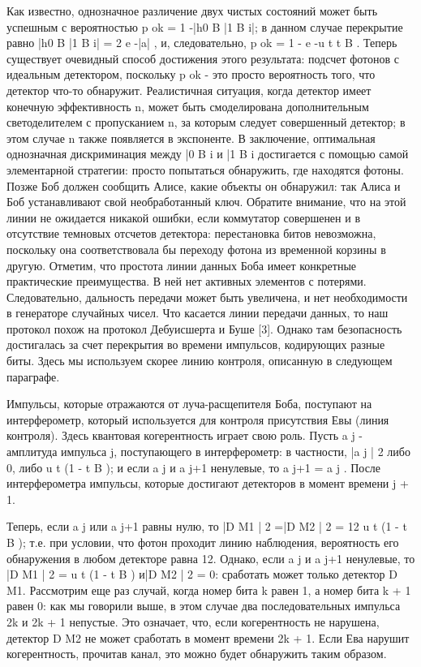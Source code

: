 Как известно, однозначное различение двух чистых состояний может быть успешным с вероятностью p ok = 1 -|h0 B |1 B i|; в данном случае перекрытие равно |h0 B |1 B i| = 2 e -|a| , и, следовательно, p ok = 1 - e -u t t B . Теперь существует очевидный способ достижения этого результата: подсчет фотонов с идеальным детектором, поскольку p ok - это просто вероятность того, что детектор что-то обнаружит. Реалистичная ситуация, когда детектор имеет конечную эффективность n, может быть смоделирована дополнительным светоделителем с пропусканием n, за которым следует совершенный детектор; в этом случае n также появляется в экспоненте. В заключение, оптимальная однозначная дискриминация между |0 B i и |1 B i достигается с помощью самой элементарной стратегии: просто попытаться обнаружить, где находятся фотоны. Позже Боб должен сообщить Алисе, какие объекты он обнаружил: так Алиса и Боб устанавливают свой необработанный ключ. Обратите внимание, что на этой линии не ожидается никакой ошибки, если коммутатор совершенен и в отсутствие темновых отсчетов детектора: перестановка битов невозможна, поскольку она соответствовала бы переходу фотона из временной корзины в другую. Отметим, что простота линии данных Боба имеет конкретные практические преимущества. В ней нет активных элементов с потерями. Следовательно, дальность передачи может быть увеличена, и нет необходимости в генераторе случайных чисел. Что касается линии передачи данных, то наш протокол похож на протокол Дебуисшерта и Буше [3]. Однако там безопасность достигалась за счет перекрытия во времени импульсов, кодирующих разные биты. Здесь мы используем скорее линию контроля, описанную в следующем параграфе.

Импульсы, которые отражаются от луча-расщепителя Боба, поступают на интерферометр, который используется для контроля присутствия Евы (линия контроля). Здесь квантовая когерентность играет свою роль. Пусть a j - амплитуда импульса j, поступающего в интерферометр: в частности, |a j | 2 либо 0, либо u t (1 - t B ); и если a j и a j+1 ненулевые, то a j+1 = a j . После интерферометра импульсы, которые достигают детекторов в момент времени j + 1.


Теперь, если a j или a j+1 равны нулю, то |D M1 | 2 =|D M2 | 2 = 12 u t (1 - t B ); т.е. при условии, что фотон проходит линию наблюдения, вероятность его обнаружения в любом детекторе равна 12. Однако, если a j и a j+1 ненулевые, то |D M1 | 2 = u t (1 - t B ) и|D M2 | 2 = 0: сработать может только детектор D M1. Рассмотрим еще раз случай, когда номер бита k равен 1, а номер бита k + 1 равен 0: как мы говорили выше, в этом случае два последовательных импульса 2k и 2k + 1 непустые. Это означает, что, если когерентность не нарушена, детектор D M2 не может сработать в момент времени 2k + 1. Если Ева нарушит когерентность, прочитав канал, это можно будет обнаружить таким образом.

